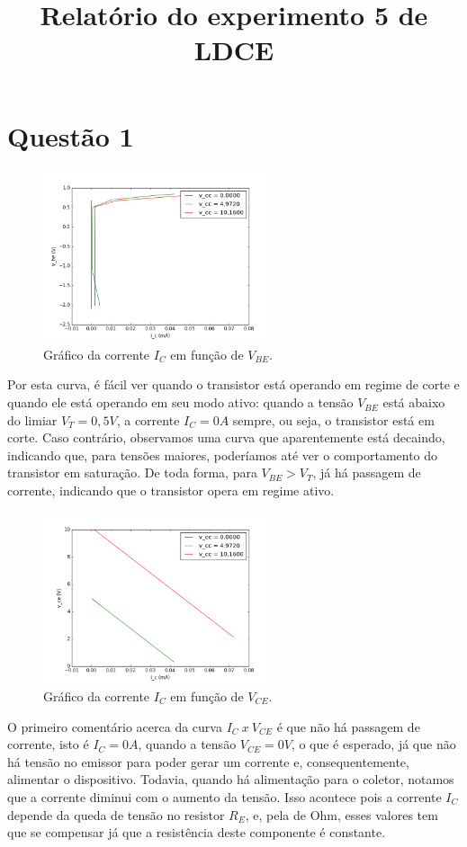 \documentclass[12pt, a4paper, twoside]{article}
\title{Relatório do experimento 5 de LDCE}
\begin{document}
\maketitle

\section{Questão 1}

\begin{figure}[H]
    \centering
    \includegraphics[width=0.6\textwidth]{figs/rel5/v_be.png}
    \caption{Gráfico da corrente $I_C$ em função de $V_{BE}$.}
\end{figure}

Por esta curva, é fácil ver quando o transistor está operando em regime de corte e quando ele está operando em seu modo ativo: quando a tensão $V_{BE}$ está abaixo do limiar $V_T = 0,5V$, a corrente $I_C = 0A$ sempre, ou seja, o transistor está em corte. Caso contrário, observamos uma curva que aparentemente está decaindo, indicando que, para tensões maiores, poderíamos até ver o comportamento do transistor em saturação. De toda forma, para $V_{BE} > V_{T}$, já há passagem de corrente, indicando que o transistor opera em regime ativo.

\begin{figure}[H]
    \centering
    \includegraphics[width=0.6\textwidth]{figs/rel5/v_ce.png}
    \caption{Gráfico da corrente $I_C$ em função de $V_{CE}$.}
\end{figure}

O primeiro comentário acerca da curva $I_C\ x\ V_{CE}$ é que não há passagem de corrente, isto é $I_C = 0A$, quando a tensão $V_{CE} = 0V$, o que é esperado, já que não há tensão no emissor para poder gerar um corrente e, consequentemente, alimentar o dispositivo. Todavia, quando há alimentação para o coletor, notamos que a corrente diminui com o aumento da tensão. Isso acontece pois a corrente $I_C$ depende da queda de tensão no resistor $R_E$, e, pela de Ohm, esses valores tem que se compensar já que a resistência deste componente é constante.
\end{document}
